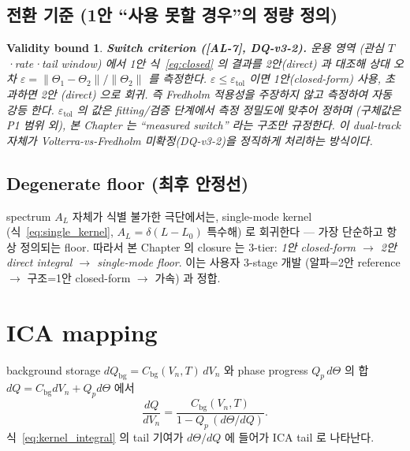 \documentclass[11pt,a4paper]{article}
\newtheorem*{boundbox}{Validity bound}
\newcommand{\bg}{\mathrm{bg}}
\newcommand{\AL}[1]{\textsf{[AL-#1]}}
\begin{document}
\subsection{전환 기준 (1안 ``사용 못할 경우''의 정량 정의)}\label{sec:switch}
\begin{boundbox}
\textbf{Switch criterion (\AL{7}, DQ-v3-2).} 운용 영역 (관심 $T$·rate·tail window) 에서
1안 식~\eqref{eq:closed} 의 결과를 2안(direct) 과 대조해 상대 오차
$\varepsilon = \lVert\Theta_{1}-\Theta_{2}\rVert / \lVert\Theta_{2}\rVert$ 를 측정한다.
$\varepsilon \le \varepsilon_{\mathrm{tol}}$ 이면 1안(closed-form) 사용, 초과하면 2안
(direct) 으로 회귀. 즉 Fredholm 적용성을 \emph{주장}하지 않고 \emph{측정}하여 자동 강등
한다. $\varepsilon_{\mathrm{tol}}$ 의 값은 fitting/검증 단계에서 측정 정밀도에 맞추어
정하며 (구체값은 P1 범위 외), 본 Chapter 는 ``measured switch'' 라는 구조만 규정한다. 이
dual-track 자체가 Volterra-vs-Fredholm 미확정(DQ-v3-2)을 정직하게 처리하는 방식이다.
\end{boundbox}

\subsection{Degenerate floor (최후 안정선)}\label{sec:floor}
spectrum $A_L$ 자체가 식별 불가한 극단에서는, single-mode kernel (식~\eqref{eq:single_kernel},
$A_L=\delta(L-L_0)$ 특수해) 로 회귀한다 — 가장 단순하고 항상 정의되는 floor. 따라서 본
Chapter 의 closure 는 3-tier: \emph{1안 closed-form $\to$ 2안 direct integral $\to$
single-mode floor}. 이는 사용자 3-stage 개발 (알파=2안 reference $\to$ 구조=1안 closed-form
$\to$ 가속) 과 정합.

\section{ICA mapping}\label{sec:ica}
background storage $dQ_\bg=C_\bg(V_n,T)\,dV_n$ 와 phase progress $Q_p\,d\Theta$ 의 합
$dQ=C_\bg dV_n+Q_p d\Theta$ 에서
\begin{equation}
\boxed{\;\frac{dQ}{dV_n}=\frac{C_\bg(V_n,T)}{1-Q_p\,(d\Theta/dQ)}.\;}
\label{eq:ica}
\end{equation}
식~\eqref{eq:kernel_integral} 의 tail 기여가 $d\Theta/dQ$ 에 들어가 ICA tail 로 나타난다.
\end{document}
